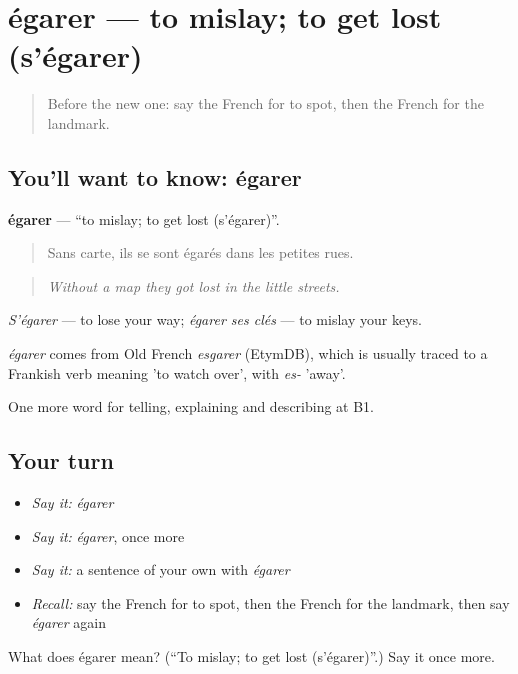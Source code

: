 \section[égarer]{égarer — to mislay; to get lost (s’égarer)}

\label{lesson:FR-C434-egarer}



\begin{quote}
Before the new one: say the French for to spot, then the French for the landmark.
\end{quote}

\subsection*{You'll want to know: égarer}
\textbf{égarer} — \textquotedblleft{}to mislay; to get lost (s’égarer)\textquotedblright{}.

\begin{quote}
Sans carte, ils se sont égarés dans les petites rues.
\end{quote}

\begin{quote}
\emph{Without a map they got lost in the little streets.}
\end{quote}

\emph{S'égarer} — to lose your way; \emph{égarer ses clés} — to mislay your keys.

\begin{cousinweb}
\emph{égarer} comes from Old French \emph{esgarer} (EtymDB), which is usually traced to a Frankish verb meaning 'to watch over', with \emph{es-} 'away'.
\end{cousinweb}

\begin{grammarlens}[title={What you've built}]
One more word for telling, explaining and describing at B1.
\end{grammarlens}

\subsection*{Your turn}
\begin{itemize}
\raggedright
  \item \emph{Say it:} \emph{égarer}
  \item \emph{Say it:} \emph{égarer}, once more
  \item \emph{Say it:} a sentence of your own with \emph{égarer}
  \item \emph{Recall:} say the French for to spot, then the French for the landmark, then say \emph{égarer} again
\end{itemize}

\begin{tcolorbox}[breakable,colback=teal!4,colframe=teal!35!black,title={Before you move on}]
What does égarer mean? (\textquotedblleft{}To mislay; to get lost (s’égarer)\textquotedblright{}.) Say it once more.
\end{tcolorbox}
